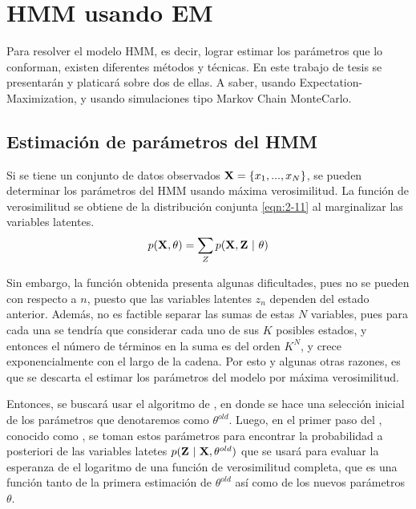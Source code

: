 
\chapter{HMM usando EM} \label{ch:chap3}

Para resolver el modelo HMM, es decir, lograr estimar los parámetros que lo conforman, existen diferentes métodos y técnicas. En este trabajo de tesis se presentarán y platicará sobre dos de ellas. A saber, usando Expectation-Maximization, y usando simulaciones tipo Markov Chain MonteCarlo.

\section{Estimación de parámetros del HMM}

Si se tiene un conjunto de datos observados $\textbf{X} = \lbrace x_1, ..., x_N \rbrace$, se pueden determinar los parámetros del HMM usando máxima verosimilitud. La función de verosimilitud se obtiene de la distribución conjunta \eqref{eqn:2-11} al marginalizar las variables latentes.
\begin{equation}
  p(\textbf{X}, \theta) = \sum_Z p(\textbf{X}, \textbf{Z} ~|~ \theta)
\label{eqn:3-1}
\end{equation}

Sin embargo, la función obtenida presenta algunas dificultades, pues no se pueden con respecto a $n$, puesto que las variables latentes $z_n$ dependen  del estado anterior. Además, no es factible separar las sumas de estas $N$ variables, pues para cada una se tendría que considerar cada uno de sus $K$ posibles estados, y entonces el número de términos en la suma es del orden $K^N$, y crece exponencialmente con el largo de la cadena. Por esto y algunas otras razones, es que se descarta el estimar los parámetros del modelo por máxima verosimilitud.

Entonces, se buscará usar el algoritmo de \aem, en donde se hace una selección inicial de los parámetros que denotaremos como $\theta^{old}$. Luego, en el primer paso del \aem, conocido como \estep, se toman estos parámetros para encontrar la probabilidad a posteriori de las variables latetes $p(\textbf{Z} ~|~ \textbf{X}, \theta^{old})$ que se usará para evaluar la esperanza de el logaritmo de una función de verosimilitud completa, que es una función tanto de la primera estimación de $\theta^{old}$ así como de los nuevos parámetros $\theta$.


